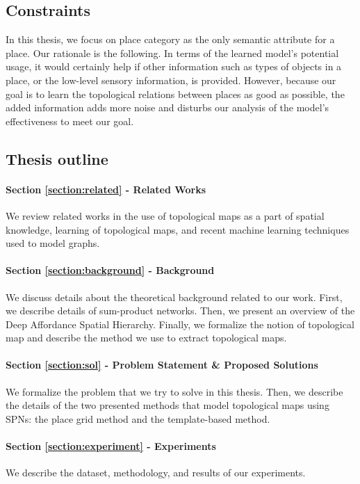 \documentclass[11pt, titlepage]{article}
\theoremstyle{definition}
\begin{document}
\subsection{Constraints}
In this thesis, we focus on place category as the only semantic attribute for a place. Our rationale is the following. In terms of the learned model's potential usage, it would certainly help if other information such as types of objects in a place, or the low-level sensory information, is provided. However, because our goal is to learn the topological relations between places as good as possible, the added information adds more noise and disturbs our analysis of the model's effectiveness to meet our goal.


\subsection{Thesis outline}

\paragraph{Section \ref{section:related} - Related Works} We review related works in the use of topological maps as a part of spatial knowledge, learning of topological maps, and recent machine learning techniques used to model graphs.

\paragraph{Section \ref{section:background} - Background} We discuss details about the theoretical background related to our work. First, we describe details of sum-product networks. Then, we present an overview of the Deep Affordance Spatial Hierarchy. Finally, we formalize the notion of topological map and describe the method we use to extract topological maps.

\paragraph{Section \ref{section:sol} - Problem Statement \& Proposed Solutions} We formalize the problem that we try to solve in this thesis. Then, we describe the details of the two presented methods that model topological maps using SPNs: the place grid method and the template-based method.

\paragraph{Section \ref{section:experiment} - Experiments} We describe the dataset, methodology, and results of our experiments.
\end{document}
